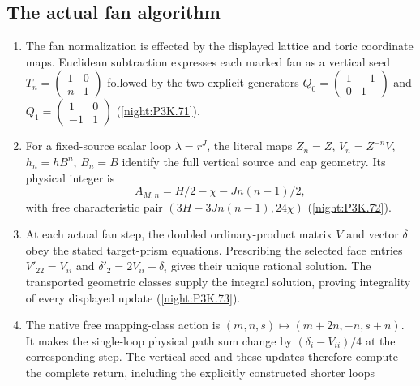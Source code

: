 \subsection{The actual fan algorithm}
\RungOne
\begin{enumerate}[label=\arabic*.]
\item The fan normalization is effected by the displayed lattice
  and toric coordinate maps.  Euclidean subtraction expresses each
  marked fan as a vertical seed
  $T_n=\left(\begin{smallmatrix}1&0\\n&1\end{smallmatrix}\right)$
  followed by the two explicit generators
  $Q_0=\left(\begin{smallmatrix}1&-1\\0&1\end{smallmatrix}\right)$
  and $Q_1=\left(\begin{smallmatrix}1&0\\-1&1\end{smallmatrix}\right)$
  (\cref{night:P3K.71}).
\item For a fixed-source scalar loop $\lambda=r^J$, the literal
  maps $Z_n=Z$, $V_n=Z^{-n}V$, $h_n=hB^n$, $B_n=B$ identify the
  full vertical source and cap geometry.  Its physical integer is
  \[
  A_{M,n}=H/2-\chi-Jn(n-1)/2,
  \]
  with free characteristic pair
  $(3H-3Jn(n-1),24\chi)$
  (\cref{night:P3K.72}).
\item At each actual fan step, the doubled ordinary-product
  matrix $V$ and vector $\delta$ obey the stated target-prism
  equations.  Prescribing the selected face entries
  $V'_{22}=V_{ii}$ and
  $\delta'_2=2V_{ii}-\delta_i$ gives their unique rational
  solution.  The transported geometric classes supply the integral
  solution, proving integrality of every displayed update
  (\cref{night:P3K.73}).
\item The native free mapping-class action is
  $(m,n,s)\mapsto(m+2n,-n,s+n)$.
  It makes the single-loop physical path sum change by
  $(\delta_i-V_{ii})/4$ at the corresponding step.  The vertical
  seed and these updates therefore compute the complete return,
  including the explicitly constructed shorter loops

\end{enumerate}
